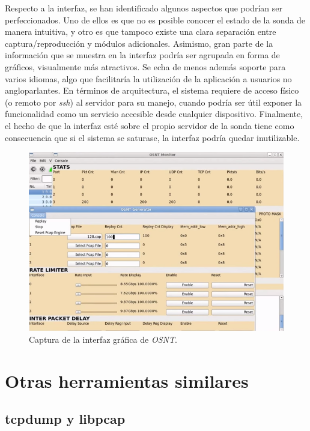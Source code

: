 Respecto a la interfaz, se han identificado algunos aspectos que podrían ser perfeccionados.
Uno de ellos es que no es posible conocer el estado de la sonda de manera intuitiva, y otro es que tampoco existe una clara separación entre captura/reproducción y módulos adicionales.
Asimismo, gran parte de la información que se muestra en la interfaz podría ser agrupada en forma de gráficos, visualmente más atractivos.
Se echa de menos además soporte para varios idiomas, algo que facilitaría la utilización de la aplicación a usuarios no angloparlantes.
En términos de arquitectura, el sistema requiere de acceso físico (o remoto por \textit{ssh}) al servidor para su manejo, cuando podría ser útil exponer la funcionalidad como un servicio accesible desde cualquier dispositivo.
Finalmente, el hecho de que la interfaz esté sobre el propio servidor de la sonda tiene como consecuencia que si el sistema se saturase, la interfaz podría quedar inutilizable.

\begin{figure}[H]
  \centering
  \includegraphics[width=\textwidth,clip=true]{graphics/capturas/osnt}
  \caption{Captura de la interfaz gráfica de \textit{OSNT}.}
  \label{fig:osnt}
\end{figure}

\section{Otras herramientas similares\label{sec:eda:otras}}

\subsection*{tcpdump y libpcap\label{sec:eda:tcpdump}}

